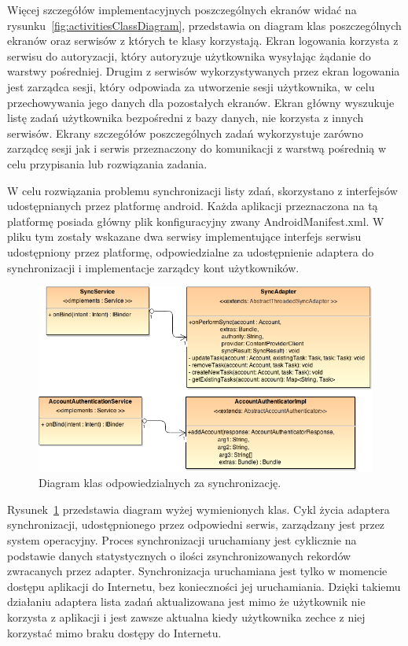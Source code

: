 Więcej szczegółów implementacyjnych poszczególnych ekranów widać na rysunku~\ref{fig:activitiesClassDiagram}, przedstawia on diagram klas poszczególnych ekranów oraz serwisów z których te klasy korzystają. Ekran logowania korzysta z serwisu do autoryzacji, który autoryzuje użytkownika wysyłając żądanie do warstwy pośredniej. Drugim z serwisów wykorzystywanych przez ekran logowania jest zarządca sesji, który odpowiada za utworzenie sesji użytkownika, w celu przechowywania jego danych dla pozostałych ekranów. Ekran główny wyszukuje listę zadań użytkownika bezpośredni z bazy danych, nie korzysta z innych serwisów. Ekrany szczegółów poszczególnych zadań wykorzystuje zarówno zarządcę sesji jak i serwis przeznaczony do komunikacji z warstwą pośrednią w celu przypisania lub rozwiązania zadania. 

W celu rozwiązania problemu synchronizacji listy zdań, skorzystano z interfejsów udostępnianych przez platformę android. Każda aplikacji przeznaczona na tą platformę posiada główny plik konfiguracyjny zwany AndroidManifest.xml. W pliku tym zostały wskazane dwa serwisy implementujące interfejs serwisu udostępniony przez platformę, odpowiedzialne za udostępnienie adaptera do synchronizacji i implementacje zarządcy kont użytkowników. 
\begin{figure}[h]
\centerline{\includegraphics[scale=0.6]{androidSyncClasses}}
\caption{Diagram klas odpowiedzialnych za synchronizację.}
\label{fig:androidSyncClasses}
\end{figure}

Rysunek~\ref{fig:androidSyncClasses} przedstawia diagram wyżej wymienionych klas. Cykl życia adaptera synchronizacji, udostępnionego przez odpowiedni serwis, zarządzany jest przez system operacyjny. Proces synchronizacji uruchamiany jest cyklicznie na podstawie danych statystycznych o ilości zsynchronizowanych rekordów zwracanych przez adapter. Synchronizacja uruchamiana jest tylko w momencie dostępu aplikacji do Internetu, bez konieczności jej uruchamiania. Dzięki takiemu działaniu adaptera lista zadań aktualizowana jest mimo że użytkownik nie korzysta z aplikacji i jest zawsze aktualna kiedy użytkownika zechce z niej korzystać mimo braku dostępy do Internetu.

